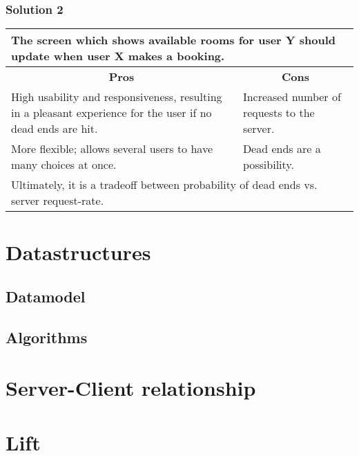\subsubsection*{Solution 2}
\begin{tabular}{|p{6cm}|p{6cm}|}
\hline
	\multicolumn{2}{|p{12cm}|}{The screen which shows available rooms for user \textbf{Y} should update when user \textbf{X} makes a booking.} \\ \hline \hline
	\multicolumn{1}{|c|}{\textbf{Pros}} & \multicolumn{1}{c|}{\textbf{Cons}} \\ \hline
	High usability and responsiveness, resulting in a pleasant experience for the user if no dead ends are hit. & Increased number of requests to the server. \\ \hline
	More flexible; allows several users to have many choices at once. & Dead ends are a possibility. \\
	\hline
	\multicolumn{2}{|p{12cm}|}{Ultimately, it is a tradeoff between probability of dead ends vs. server request-rate.} \\
	\hline
\end{tabular}

\section{Datastructures}

\subsection{Datamodel}

\subsection{Algorithms}

\section{Server-Client relationship}

\section{Lift}
